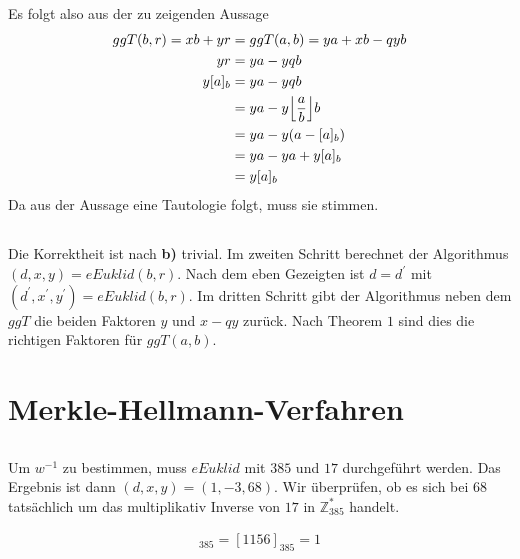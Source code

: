 \documentclass{../crypto}
\begin{document}
Es folgt also aus der zu zeigenden Aussage
\begin{align*}
   ggT(b,r) = xb + yr & = ggT(a,b) = ya + xb - qyb     \\
            yr        & = ya - yqb                     \\
            y [a]_b   & = ya - yqb                     \\
                      & = ya -y \floor*{\frac{a}{b}} b \\
                      & = ya - y(a - [a]_b)            \\
                      & = ya - ya + y [a]_b            \\
                      & = y [a]_b
\end{align*}
Da aus der Aussage eine Tautologie folgt, muss sie stimmen.

\subsection{}

Die Korrektheit ist nach \textbf{b)} trivial. Im zweiten Schritt berechnet der
Algorithmus $(d,x,y) = eEuklid(b,r)$. Nach dem eben Gezeigten ist $d = d^\prime$
mit $(d^\prime, x^\prime,y^\prime) = eEuklid(b,r)$. Im dritten Schritt gibt der
Algorithmus neben dem $ggT$ die beiden Faktoren $y$ und $x-qy$ zurück. Nach
Theorem $1$ sind dies die richtigen Faktoren für $ggT(a,b)$.

\section{Merkle-Hellmann-Verfahren}

\subsection{}

Um $w^{-1}$ zu bestimmen, muss $eEuklid$ mit $385$ und $17$ durchgeführt werden. Das
Ergebnis ist dann $(d,x,y) = (1,-3,68)$. Wir überprüfen, ob es sich bei $68$
tatsächlich um das multiplikativ Inverse von $17$ in $\mathbb{Z}_{385}^*$ handelt.

\begin{align*}
   [17 \cdot 68]_{385} = [1156]_{385} = 1
\end{align*}

\subsection{}
\end{document}
